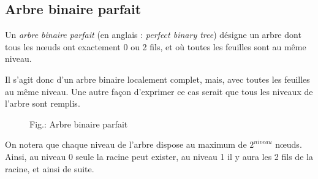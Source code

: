 \documentclass[11pt,a4paper]{article}
\begin{document}
\medskip

\subsection{Arbre binaire parfait}

Un \textit{arbre binaire parfait} (en anglais : \textit{perfect binary tree}) désigne un arbre dont tous les nœuds ont exactement 0 ou 2 fils, et où toutes les feuilles sont au même niveau.

Il s'agit donc d'un arbre binaire localement complet, mais, avec toutes les feuilles au même niveau.
Une autre façon d'exprimer ce cas serait que tous les niveaux de l'arbre sont remplis.

\begin{figure}[ht!]
\caption{Fig.\thefigure : Arbre binaire parfait}
\label{fig:example3-perfect-binary-tree}
\end{figure}


On notera que chaque niveau de l'arbre dispose au maximum de $ 2^{niveau} $ nœuds.
Ainsi, au niveau 0 seule la racine peut exister, au niveau 1 il y aura les 2 fils de la racine, et ainsi de suite.
\end{document}
